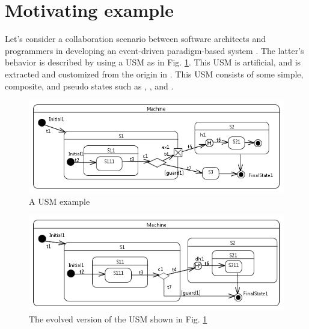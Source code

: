 \section{Motivating example}
\label{sec:motivation}
Let's consider a collaboration scenario between software architects and programmers in developing an event-driven paradigm-based system . The latter's behavior is described by using a USM as in Fig. \ref{fig:IllustrationExample1}.
This USM is artificial, and is extracted and customized from the origin in \cite{shuang_formalizing}.
This USM consists of some simple, composite, and pseudo states such as , , and .

\begin{figure}
	\centering
	\includegraphics[clip, trim=0.2cm 0.2cm 0.2cm 0.2cm, width=1.0\columnwidth]{figures/IllustrationExample1.png}
	\caption{A USM example} 
	\label{fig:IllustrationExample1}
\end{figure}

\begin{figure}
	\centering
	\includegraphics[clip, trim=0.2cm 0.2cm 0.1cm 0.2cm, width=1.0\columnwidth]{figures/IllustrationExample2.png}
	\caption{The evolved version of the USM shown in Fig. \ref{fig:IllustrationExample1}} 
	\label{fig:IllustrationExample2}
\end{figure}


